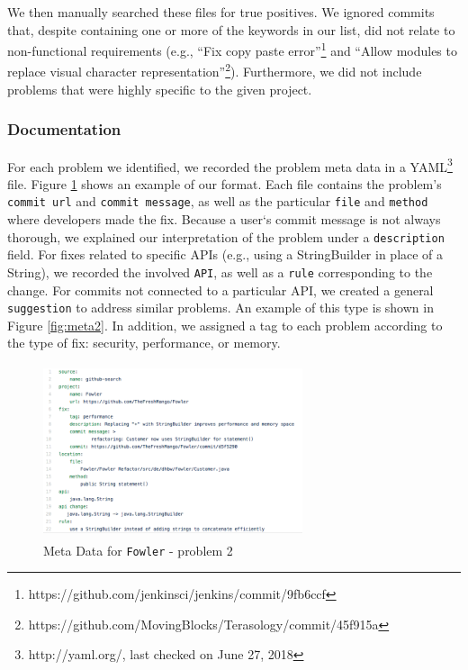 \documentclass[sigconf]{acmart}
\begin{document}
We then manually searched these files for true positives. We ignored commits that, despite containing one or more of the keywords in our list, did not relate to non-functional requirements (e.g., ``Fix copy paste error''\footnote{https://github.com/jenkinsci/jenkins/commit/9fb6ccf} and ``Allow modules to replace visual character representation''\footnote{https://github.com/MovingBlocks/Terasology/commit/45f915a}). Furthermore, we did not include problems that were highly specific to the given project. 

\subsubsection{Documentation} 
For each problem we identified, we recorded the problem meta data in a YAML\footnote{http://yaml.org/, last checked on June 27, 2018} file. Figure \ref{fig:meta1} shows an example of our format. Each file contains the problem's \texttt{commit url} and \texttt{commit message}, as well as the particular \texttt{file} and \texttt{method} where developers made the fix. Because a user`s commit message is not always thorough, we explained our interpretation of the problem under a \texttt{description} field. For fixes related to specific APIs (e.g., using a StringBuilder in place of  a String), we recorded the involved \texttt{API}, as well as a \texttt{rule} corresponding to the change. For commits not connected to a particular API, we created a general \texttt{suggestion} to address similar problems. An example of this type is shown in Figure \ref{fig:meta2}. In addition, we assigned a tag to each problem according to the type of fix: security, performance, or memory.

\begin{figure}
\includegraphics[height=2in, width=3in]{YAMLmetadata}
\caption{Meta Data for \texttt{Fowler} - problem 2}
\label{fig:meta1}
\end{figure}
\end{document}
